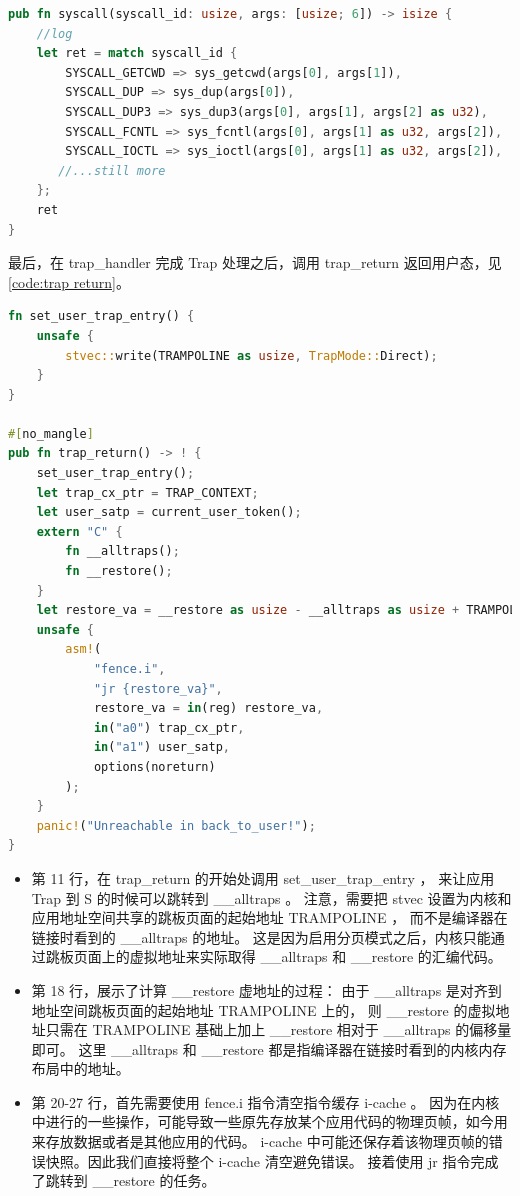 \begin{lstlisting}[language={Rust}, label={code:syscall},
    caption={syscall}]
pub fn syscall(syscall_id: usize, args: [usize; 6]) -> isize {
	//log
    let ret = match syscall_id {
        SYSCALL_GETCWD => sys_getcwd(args[0], args[1]),
        SYSCALL_DUP => sys_dup(args[0]),
        SYSCALL_DUP3 => sys_dup3(args[0], args[1], args[2] as u32),
        SYSCALL_FCNTL => sys_fcntl(args[0], args[1] as u32, args[2]),
        SYSCALL_IOCTL => sys_ioctl(args[0], args[1] as u32, args[2]),
       //...still more
    };
    ret
}
\end{lstlisting}

最后，在 trap_handler 完成 Trap 处理之后，调用 trap_return 返回用户态，见\autoref{code:trap return}。

\begin{lstlisting}[language={Rust}, label={code:trap return},
    caption={trap_return}]
fn set_user_trap_entry() {
    unsafe {
        stvec::write(TRAMPOLINE as usize, TrapMode::Direct);
    }
}

#[no_mangle]
pub fn trap_return() -> ! {
    set_user_trap_entry();
    let trap_cx_ptr = TRAP_CONTEXT;
    let user_satp = current_user_token();
    extern "C" {
        fn __alltraps();
        fn __restore();
    }
    let restore_va = __restore as usize - __alltraps as usize + TRAMPOLINE;
    unsafe {
        asm!(
            "fence.i",
            "jr {restore_va}",
            restore_va = in(reg) restore_va,
            in("a0") trap_cx_ptr,
            in("a1") user_satp,
            options(noreturn)
        );
    }
    panic!("Unreachable in back_to_user!");
}
\end{lstlisting}

\begin{itemize}
    \item 第 11 行，在 trap_return 的开始处调用 set_user_trap_entry ，
    来让应用 Trap 到 S 的时候可以跳转到 __alltraps 。
    注意，需要把 stvec 设置为内核和应用地址空间共享的跳板页面的起始地址 TRAMPOLINE ，
    而不是编译器在链接时看到的 __alltraps 的地址。
    这是因为启用分页模式之后，内核只能通过跳板页面上的虚拟地址来实际取得 __alltraps 和 __restore 的汇编代码。

    \item 第 18 行，展示了计算 __restore 虚地址的过程：
    由于 __alltraps 是对齐到地址空间跳板页面的起始地址 TRAMPOLINE 上的， 
    则 __restore 的虚拟地址只需在 TRAMPOLINE 基础上加上 __restore 相对于 __alltraps 的偏移量即可。
    这里 __alltraps 和 __restore 都是指编译器在链接时看到的内核内存布局中的地址。

    \item 第 20-27 行，首先需要使用 fence.i 指令清空指令缓存 i-cache 。
    因为在内核中进行的一些操作，可能导致一些原先存放某个应用代码的物理页帧，如今用来存放数据或者是其他应用的代码。
    i-cache 中可能还保存着该物理页帧的错误快照。因此我们直接将整个 i-cache 清空避免错误。
    接着使用 jr 指令完成了跳转到 __restore 的任务。
\end{itemize}
